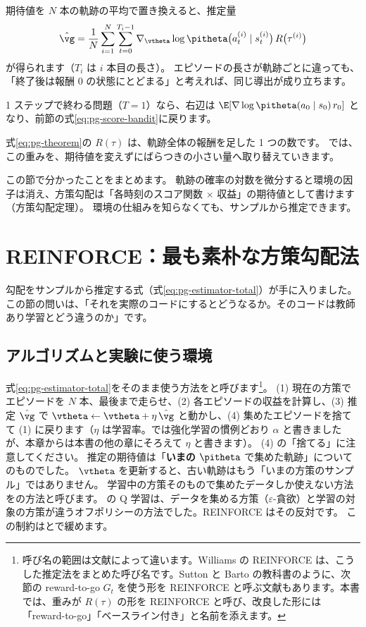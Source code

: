 期待値を $N$ 本の軌跡の平均で置き換えると、推定量
\begin{equation}
\hat{\vg}=\frac1N\sum_{i=1}^{N}\sum_{t=0}^{T_i-1}\nabla_{\vtheta}\log\pitheta\bigl(a^{(i)}_t\mid s^{(i)}_t\bigr)\,R\bigl(\tau^{(i)}\bigr)
\label{eq:pg-estimator-total}
\end{equation}
が得られます（$T_i$ は $i$ 本目の長さ）。
エピソードの長さが軌跡ごとに違っても、「終了後は報酬 0 の状態にとどまる」と考えれば、同じ導出が成り立ちます。

1 ステップで終わる問題（$T=1$）なら、右辺は $\E[\nabla\log\pitheta(a_0\mid s_0)\,r_0]$ となり、前節の式\eqref{eq:pg-score-bandit}に戻ります。

式\eqref{eq:pg-theorem}の $R(\tau)$ は、軌跡全体の報酬を足した 1 つの数です。
では、この重みを、期待値を変えずにばらつきの小さい量へ取り替えていきます。

この節で分かったことをまとめます。
軌跡の確率の対数を微分すると環境の因子は消え、方策勾配は「各時刻のスコア関数 $\times$ 収益」の期待値として書けます（方策勾配定理）。
環境の仕組みを知らなくても、サンプルから推定できます。

\section{REINFORCE：最も素朴な方策勾配法}\label{sec:pg-reinforce}

勾配をサンプルから推定する式（式\eqref{eq:pg-estimator-total}）が手に入りました。
この節の問いは、「それを実際のコードにするとどうなるか。そのコードは教師あり学習とどう違うのか」です。

\subsection*{アルゴリズムと実験に使う環境}

式\eqref{eq:pg-estimator-total}をそのまま使う方法をと呼びます\cite{williams1992simple}\footnote{呼び名の範囲は文献によって違います。Williams の REINFORCE は、こうした推定法をまとめた呼び名です。Sutton と Barto の教科書\cite{sutton2018rl}のように、次節の reward-to-go $G_t$ を使う形を REINFORCE と呼ぶ文献もあります。本書では、重みが $R(\tau)$ の形を REINFORCE と呼び、改良した形には「reward-to-go」「ベースライン付き」と名前を添えます。}。
(1) 現在の方策でエピソードを $N$ 本、最後まで走らせ、(2) 各エピソードの収益を計算し、(3) 推定 $\hat{\vg}$ で $\vtheta\leftarrow\vtheta+\eta\,\hat{\vg}$ と動かし、(4) 集めたエピソードを捨てて (1) に戻ります（$\eta$ は学習率。では強化学習の慣例どおり $\alpha$ と書きましたが、本章からは本書の他の章にそろえて $\eta$ と書きます）。
(4) の「捨てる」に注意してください。
推定の期待値は「\textbf{いまの} $\pitheta$ で集めた軌跡」についてのものでした。
$\vtheta$ を更新すると、古い軌跡はもう「いまの方策のサンプル」ではありません。
学習中の方策そのもので集めたデータしか使えない方法をの方法と呼びます。
の Q 学習は、データを集める方策（$\varepsilon$-貪欲）と学習の対象の方策が違うオフポリシーの方法でした。REINFORCE はその反対です。
この制約はとで緩めます。

